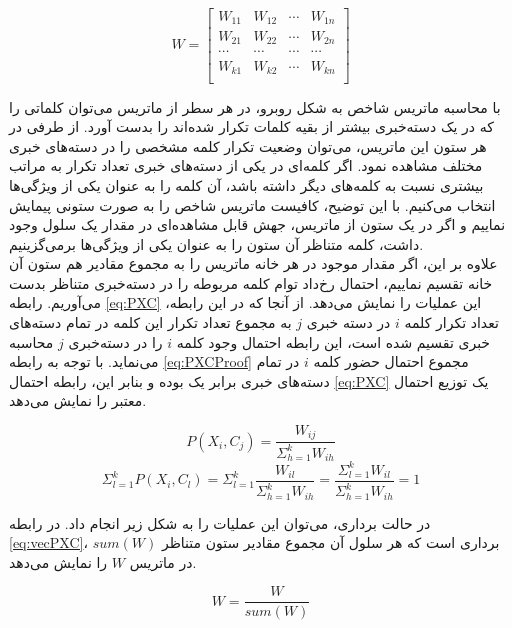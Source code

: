 \documentclass[11.5pt,a4paper]{article}
\begin{document}
\begin{equation}
\label{eq:indexMatrix}
W = \begin{bmatrix}
W_{11} & W_{12} & \cdots & W_{1n} \\
W_{21} & W_{22} & \cdots & W_{2n} \\
\cdots & \cdots & \cdots & \cdots \\
W_{k1} & W_{k2} & \cdots & W_{kn} \\
\end{bmatrix}
\end{equation}

با محاسبه ماتریس شاخص به شکل روبرو، در هر سطر از ماتریس می‌توان کلماتی را که در یک دسته‌خبری بیشتر از بقیه کلمات تکرار شده‌اند را بدست آورد. از طرفی در هر ستون این ماتریس،‌ می‌توان وضعیت تکرار کلمه مشخصی را در دسته‌های خبری مختلف مشاهده نمود. اگر کلمه‌ای در یکی از دسته‌های خبری تعداد تکرار به مراتب بیشتری نسبت به کلمه‌های دیگر داشته باشد، آن کلمه را به عنوان یکی از ویژگی‌ها انتخاب می‌کنیم. با این توضیح، کافیست ماتریس شاخص را به صورت ستونی پیمایش نماییم و اگر در یک ستون از ماتریس، جهش قابل مشاهده‌ای در مقدار یک سلول وجود داشت، کلمه متناظر آن ستون را به عنوان یکی از ویژگی‌ها برمی‌گزینیم.\\
علاوه بر این، اگر مقدار موجود در هر خانه ماتریس را به مجموع مقادیر هم ستون آن خانه تقسیم نماییم، احتمال رخ‌داد توام کلمه مربوطه را در دسته‌خبری متناظر بدست می‌آوریم. رابطه \ref{eq:PXC} این عملیات را نمایش می‌دهد. از آنجا که در این رابطه، تعداد تکرار کلمه $i$ در دسته خبری $j$ به مجموع تعداد تکرار این کلمه در تمام دسته‌های خبری تقسیم شده است، این رابطه احتمال وجود کلمه $i$ را در دسته‌خبری $j$ محاسبه می‌نماید. با توجه به رابطه \ref{eq:PXCProof} مجموع احتمال‌ حضور کلمه $i$ در تمام دسته‌های خبری برابر یک بوده و بنابر این، رابطه احتمال \ref{eq:PXC} یک توزیع احتمال معتبر را نمایش می‌دهد.

\begin{equation}
\label{eq:PXC}
P(X_i, C_j) = \frac{W_{ij}}{\Sigma_{h=1}^{k} W_{ih}}
\end{equation}
\begin{equation}
\label{eq:PXCProof}
\Sigma_{l=1}^{k} P(X_i, C_l) = \Sigma_{l=1}^{k} \frac{W_{il}}{\Sigma_{h=1}^{k} W_{ih}} = \frac{\Sigma_{l=1}^{k} W_{il}}{\Sigma_{h=1}^{k} W_{ih}} = 1 
\end{equation}

در حالت برداری، می‌توان این عملیات را به شکل زیر انجام داد. در رابطه \ref{eq:vecPXC}، $sum(W)$ برداری است که هر سلول آن مجموع مقادیر ستون‌ متناظر در ماتریس $W$ را نمایش می‌دهد.

\begin{equation}
\label{eq:vecPXC}
W = \frac{W}{sum(W)}
\end{equation}
\end{document}
